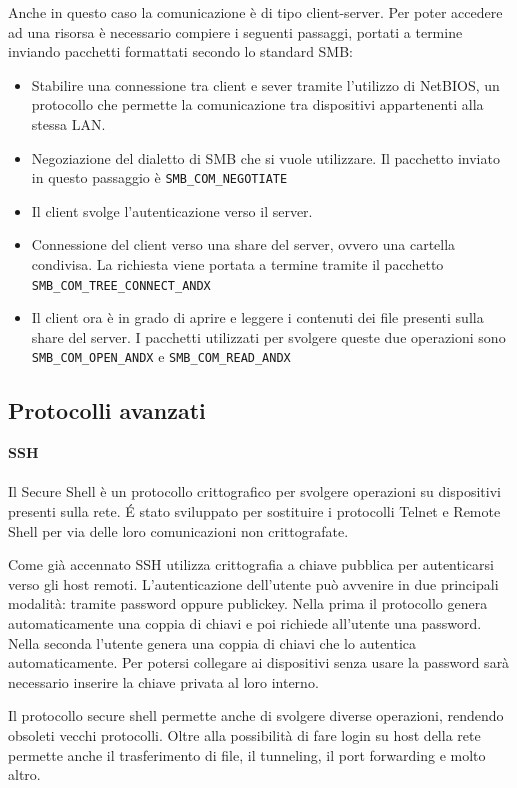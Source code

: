 \documentclass[12pt]{report}
\begin{document}
Anche in questo caso la comunicazione è di tipo client-server. Per poter accedere ad una risorsa è necessario compiere i seguenti passaggi, portati a termine inviando pacchetti formattati secondo lo standard SMB:
\begin{itemize}
    \item Stabilire una connessione tra client e sever tramite l'utilizzo di NetBIOS, un protocollo che permette la comunicazione tra dispositivi appartenenti alla stessa LAN.
    \item Negoziazione del dialetto di SMB che si vuole utilizzare. Il pacchetto inviato in questo passaggio è \lstinline{SMB_COM_NEGOTIATE}
    \item Il client svolge l'autenticazione verso il server.
    \item Connessione del client verso una share del server, ovvero una cartella condivisa. La richiesta viene portata a termine tramite il pacchetto \lstinline{SMB_COM_TREE_CONNECT_ANDX}
    \item Il client ora è in grado di aprire e leggere i contenuti dei file presenti sulla share del server. I pacchetti utilizzati per svolgere queste due operazioni sono \lstinline{SMB_COM_OPEN_ANDX} e \lstinline{SMB_COM_READ_ANDX}
\end{itemize}

\subsection{Protocolli avanzati}

\textbf{SSH}
\\\\
Il Secure Shell è un protocollo crittografico per svolgere operazioni su dispositivi presenti sulla rete. \'{E} stato sviluppato per sostituire i protocolli Telnet e Remote Shell per via delle loro comunicazioni non crittografate.

Come già accennato SSH utilizza crittografia a chiave pubblica per autenticarsi verso gli host remoti. L'autenticazione dell'utente può avvenire in due principali modalità: tramite password oppure publickey. Nella prima il protocollo genera automaticamente una coppia di chiavi e poi richiede all'utente una password. Nella seconda l'utente genera una coppia di chiavi che lo autentica automaticamente. Per potersi collegare ai dispositivi senza usare la password sarà necessario inserire la chiave privata al loro interno.

Il protocollo secure shell permette anche di svolgere diverse operazioni, rendendo obsoleti vecchi protocolli. Oltre alla possibilità di fare login su host della rete permette anche il trasferimento di file, il tunneling, il port forwarding e molto altro.\cite{rfcSSH}
\end{document}
